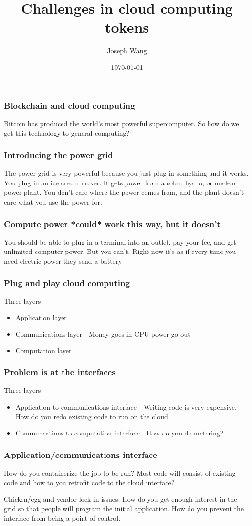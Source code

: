 \documentclass{beamer}
\title{Challenges in cloud computing tokens}
\author{Joseph Wang}
\date{\today}
\begin{document}
\begin{frame}
  \titlepage
\end{frame}

\begin{frame}
  \frametitle{Blockchain and cloud computing}
  Bitcoin has produced the world's most powerful supercomputer.  So
  how do we get this technology to general computing?
\end{frame}

\begin{frame}
  \frametitle{Introducing the power grid}
  The power grid is very powerful because you just plug in something
  and it works.  You plug in an ice cream maker.  It gets power from a
  solar, hydro, or nuclear power plant.  You don't care where the
  power comes from, and the plant doesn't care what you use the power
  for.
\end{frame}

\begin{frame}
  \frametitle{Compute power *could* work this way, but it doesn't}
  You should be able to plug in a terminal into an outlet, pay your
  fee, and get unlimited computer power.  But you can't.  Right now
  it's as if every time you need electric power they send a battery
\end{frame}

\begin{frame}
  \frametitle{Plug and play cloud computing}
  Three layers
  \begin{itemize}
  \item Application layer
  \item Communications layer - Money goes in CPU power go out
  \item Computation layer
  \end{itemize}
\end{frame}

\begin{frame}
  \frametitle{Problem is at the interfaces}
  Three layers
  \begin{itemize}
  \item Application to communications interface - Writing code is very
    expensive.  How do you redo existing code to run on the cloud
  \item Communcations to computation interface - How do you do metering?
  \end{itemize}
\end{frame}

\begin{frame}
  \frametitle{Application/communications interface}
  How do you containerize the job to be run?  Most code will consist
  of existing code and how to you retrofit code to the cloud
  interface?

  Chicken/egg and vendor lock-in issues.  How do you get enough
  interest in the grid so that people will program the initial
  application.  How do you prevent the interface from being a point of
  control.
\end{frame}
\end{document}
